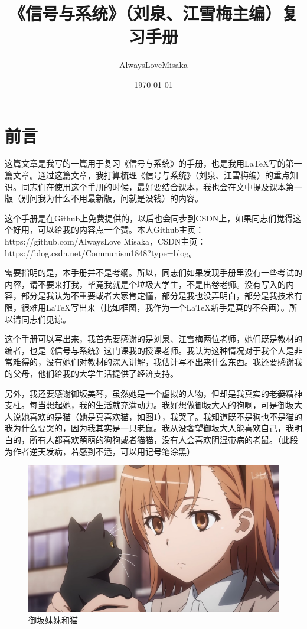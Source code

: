 \documentclass[UTF8,a4paper,11pt]{article}
\title{\huge\heiti《信号与系统》（刘泉、江雪梅主编）复习手册}
\author{AlwaysLoveMisaka}
\date{\today}
\begin{document}
\maketitle
\thispagestyle{empty}
\clearpage

\tableofcontents
\thispagestyle{empty}
\clearpage

\setcounter{page}{1}
\section{前言}
这篇文章是我写的一篇用于复习《信号与系统》的手册，也是我用\LaTeX 写的第一篇文章。通过这篇文章，我打算梳理《信号与系统》（刘泉、江雪梅编）的重点知识。同志们在使用这个手册的时候，最好要结合课本，我也会在文中提及课本第一版（别问我为什么不用最新版，问就是没钱）的内容。

这个手册是在Github上免费提供的，以后也会同步到CSDN上，如果同志们觉得这个好用，可以给我的内容点一个赞。本人Github主页：https://github.com/AlwaysLove Misaka，CSDN主页：https://blog.csdn.net/Communism1848?type=blog。

需要指明的是，本手册并不是考纲。所以，同志们如果发现手册里没有一些考试的内容，请不要来打我，毕竟我就是个垃圾大学生，不是出卷老师。没有写入的内容，部分是我认为不重要或者大家肯定懂，部分是我也没弄明白，部分是我技术有限，很难用\LaTeX 写出来（比如框图，我作为一个\LaTeX 新手是真的不会画）。所以请同志们见谅。

这个手册可以写出来，我首先要感谢的是刘泉、江雪梅两位老师，她们既是教材的编者，也是《信号与系统》这门课我的授课老师。我认为这种情况对于我个人是非常难得的，没有她们对教材的深入讲解，我估计写不出来什么东西。我还要感谢我的父母，他们给我的大学生活提供了经济支持。

另外，我还要感谢御坂美琴，虽然她是一个虚拟的人物，但却是我真实的\sout{老婆}精神支柱。每当想起她，我的生活就充满动力。我好想做御坂大人的狗啊，可是御坂大人说她喜欢的是猫（她是真喜欢猫，如图1），我哭了。我知道既不是狗也不是猫的我为什么要哭的，因为我其实是一只老鼠。我从没奢望御坂大人能喜欢自己，我明白的，所有人都喜欢萌萌的狗狗或者猫猫，没有人会喜欢阴湿带病的老鼠。（此段为作者逆天发病，若感到不适，可以用记号笔涂黑）
\newline
\begin{figure}[htbp]
\centering
\includegraphics[scale=0.2]{cat.jpg}
\caption{御坂妹妹和猫}
\label{figure}
\end{figure}
\end{document}
